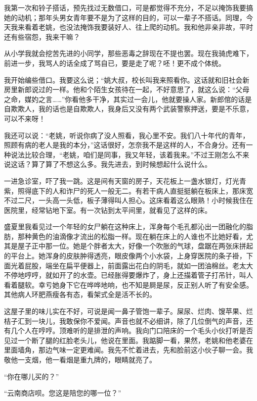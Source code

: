  我第一次和铃子搭话，预先找过无数借口，可是都觉得不充分，不足以掩饰我要搞她的动机；那年头男女青年要不是为了这样的目的，可以一辈子不搭话。同理，今天我来看着老姚，也没法掩饰我要装好人、往上爬的动机。我和他非亲非故，平时还有些宿怨，我来干嘛？ 
 
 从小学我就会挖苦先进的小同学，那些恶毒之辞现在不提也罢。现在我骑虎难下，前进一步，我骂人的话全成了骂自已，要是走了呢？呸！更不成个体统。 
 
 我开始编些借口。我要这么说；“姚大叔，校长叫我来照看你。这话就和旧社会新房里新郎说过的一样。他和个陌生女孩待在一起，不好意思了，就这么说：“父母之命，媒妁之言……”你看他多干净，其实过一会儿，他就要操人家。新郎倌的话是自欺欺人，我的话也是自欺欺人，我身后又没有两个武装警察押送，要是不乐意，可以不来呀！ 
 
 我还可以说：“老姚，听说你病了没人照看，我心里不安。我们八十年代的青年，照顾有病的老人是我的本分，”这话很好，怎奈我不是这样的人，不合身分。还有一种说法比较合理，“老姚，咱们是同事，我又年轻，该着我来。”不过王刚怎么不来说这话？算了算了不想这么多。我先进去，到时候想起什么说什么。 
 
 一进急诊室，吓了我一跳。这是间有天窗的房子，天花板上一盏水银灯，灯光青紫，照得底下的人和诈尸的死人一般无二。有若干病人直挺挺躺在板床上，那床宽不过二尺，一头高一头低，板子薄得叫人担心。这床看着这么眼熟！小时候我住在医院里，经常钻地下室。有一次钻到太平间里，就看见了这样的床。 
 
 盛夏里我看见过一个年轻的女尸躺在这种床上，浑身每个毛孔都沁出一团融化的脂肪，那种黄色的油滴像才流出的松脂一样。现在躺在床上的人谁也不比她好看，尤其是屋子正中那一位。她是个胖者太大，好像一个吹胀的气球，盘踞在两张床拼起的平台上。她浑身的皮肤肿得透亮，眼皮像两个小水袋，上身穿医院的条子褂，下面光着屁股，端坐在扁平便器上，前面露出花白的阴毛，就如一团油棉丝。老太大不停地哼哼，就如开了的水壶。已经胀得要爆炸了，身上还描着管子打吊针，叫人看着腿软。幸亏她身下它在哗哗地响，也不知是屙是尿，反正别人听了有安全感。其他病人环肥燕瘦各有态，看架式全是活不长的。 
 
 这屋子里的味儿实在不好，可说是闻一鼻子管饱一辈子。屎尿、烂肉、馊苹果、烂桔子汇到一块儿，我敢保你不爱闻。声音也就不必细讲，除了几位倒气的声音，还有几个人在哼哼。顶难听的是排泄的声响。我向门口陪床的一个毛头小伙打听是否见过一个断了腿的红脸老头儿，他说在里面。我踮脚一看，果然，老姚和他老婆在里面墙角，那边气味一定更难闻。我先不忙着进去，先和脸前这小伙子聊一会。我敬他一支烟，他一看烟是重九牌的，眼睛就亮了。 
 
 “你在哪儿买的？” 
 
 “云南商店呗。您这是陪您的哪一位？” 
 
